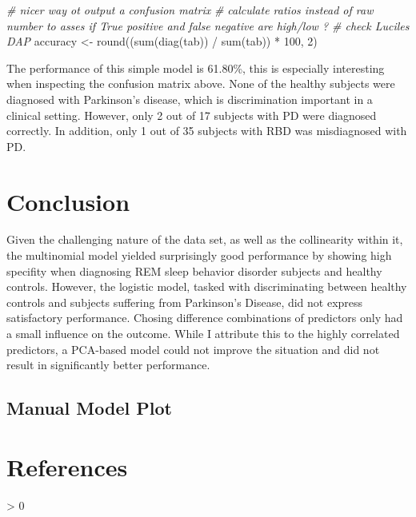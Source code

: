 \documentclass[
  english,
  doc,floatsintext]{apa6}
\newenvironment{Shaded}{\begin{snugshade}}{\end{snugshade}}
\newcommand{\CommentTok}[1]{\textcolor[rgb]{0.56,0.35,0.01}{\textit{#1}}}
\newcommand{\DecValTok}[1]{\textcolor[rgb]{0.00,0.00,0.81}{#1}}
\newcommand{\FunctionTok}[1]{\textcolor[rgb]{0.00,0.00,0.00}{#1}}
\newcommand{\NormalTok}[1]{#1}
\newcommand{\OtherTok}[1]{\textcolor[rgb]{0.56,0.35,0.01}{#1}}
\newcommand{\SpecialCharTok}[1]{\textcolor[rgb]{0.00,0.00,0.00}{#1}}
\newlength{\cslhangindent}
\newenvironment{CSLReferences}[2] %
 {%
  \setlength{\parindent}{0pt}
  \ifodd #1 \everypar{\setlength{\hangindent}{\cslhangindent}}\ignorespaces\fi
  \ifnum #2 > 0
  \setlength{\parskip}{#2\baselineskip}
  \fi
 }%
 {}
\begin{document}
\begin{Shaded}
\begin{Highlighting}[]
\CommentTok{\# nicer way ot output a confusion matrix}
\CommentTok{\# calculate ratios instead of raw number to asses if True positive and false negative are high/low ? \# check Lucile\textquotesingle{}s DAP}
\NormalTok{accuracy }\OtherTok{\textless{}{-}} \FunctionTok{round}\NormalTok{((}\FunctionTok{sum}\NormalTok{(}\FunctionTok{diag}\NormalTok{(tab)) }\SpecialCharTok{/} \FunctionTok{sum}\NormalTok{(tab)) }\SpecialCharTok{*} \DecValTok{100}\NormalTok{, }\DecValTok{2}\NormalTok{)}
\end{Highlighting}
\end{Shaded}

The performance of this simple model is 61.80\%, this is especially interesting when inspecting the
confusion matrix above. None of the healthy subjects were diagnosed with Parkinson's disease, which is discrimination
important in a clinical setting. However, only 2 out of 17
subjects with PD were diagnosed correctly. In
addition, only 1 out of 35 subjects with RBD was misdiagnosed with PD.

\hypertarget{conclusion}{%
\section{Conclusion}\label{conclusion}}

Given the challenging nature of the data set, as well as the collinearity within it, the multinomial model
yielded surprisingly good performance by showing high specifity when diagnosing REM sleep behavior disorder
subjects and healthy controls. However, the logistic model, tasked with discriminating between
healthy controls and subjects suffering from Parkinson's Disease, did not express satisfactory performance. Chosing
difference combinations of predictors only had a small influence on the outcome. While I attribute this to
the highly correlated predictors, a PCA-based model could not improve the situation and did not result in
significantly better performance.

\clearpage

\hypertarget{manual-model-plot}{%
\subsection{Manual Model Plot}\label{manual-model-plot}}

\clearpage

\hypertarget{references}{%
\section{References}\label{references}}

\begingroup
\setlength{\parindent}{-0.5in}
\setlength{\leftskip}{0.5in}

\hypertarget{refs}{}
\begin{CSLReferences}{0}{0}
\end{CSLReferences}

\endgroup
\end{document}
